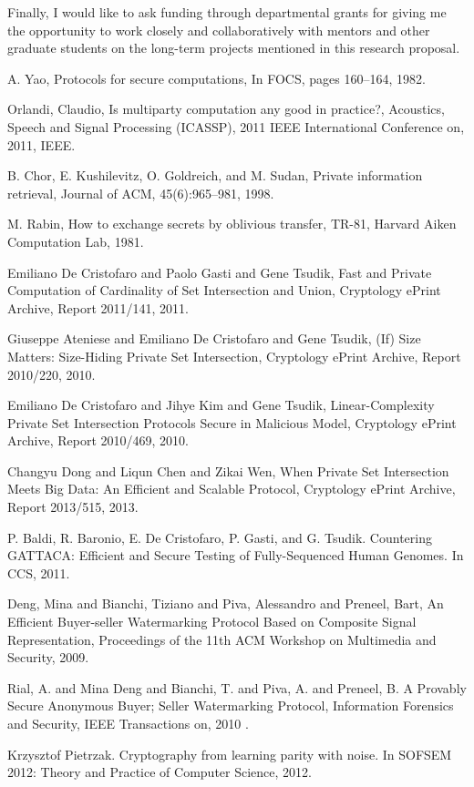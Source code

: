 \documentclass[dvips,12pt]{article}
\begin{document}
Finally, I would like to ask funding through departmental grants for giving me the opportunity to work closely and collaboratively with mentors and other graduate students on the long-term projects mentioned in this research proposal.
\begin{thebibliography}{99}

	A. Yao,
	Protocols for secure computations,	
	In FOCS, pages 160–164, 1982.

	Orlandi, Claudio,  	
  	Is multiparty computation any good in practice?,
  	{Acoustics, Speech and Signal Processing (ICASSP), 2011 IEEE International Conference on},
  	2011,
  	IEEE.

	B. Chor, E. Kushilevitz, O. Goldreich, and M. Sudan,	
	Private information retrieval,
	Journal of ACM, 45(6):965–981, 
	1998.

	M. Rabin,
	How to exchange secrets by oblivious transfer,
	TR-81, Harvard Aiken Computation Lab, 
	1981.

	Emiliano De Cristofaro and Paolo Gasti and Gene Tsudik,	
	Fast and Private Computation of Cardinality of Set Intersection and Union, 
    Cryptology ePrint Archive, Report 2011/141,
    2011.
    
	Giuseppe Ateniese and Emiliano De Cristofaro and Gene Tsudik,
    (If) Size Matters: Size-Hiding Private Set Intersection,
    Cryptology ePrint Archive, Report 2010/220,
	2010.

	Emiliano De Cristofaro and Jihye Kim and Gene Tsudik,	
	Linear-Complexity Private Set Intersection Protocols Secure in Malicious Model,
	Cryptology ePrint Archive, Report 2010/469,
	2010.

	Changyu Dong and Liqun Chen and Zikai Wen,
	When Private Set Intersection Meets Big Data: An Efficient and Scalable Protocol,
	Cryptology ePrint Archive, Report 2013/515,
	2013.
	
	P. Baldi, R. Baronio, E. De Cristofaro, P. Gasti, and G. Tsudik. 
	Countering GATTACA: Efficient and Secure Testing of Fully-Sequenced Human Genomes.
	In CCS, 
	2011.
	
	Deng, Mina and Bianchi, Tiziano and Piva, Alessandro and Preneel, Bart,
	An Efficient Buyer-seller Watermarking Protocol Based on Composite Signal Representation,
	Proceedings of the 11th ACM Workshop on Multimedia and Security,
	2009.
	
	Rial, A. and Mina Deng and Bianchi, T. and Piva, A. and Preneel, B.
	A Provably Secure Anonymous Buyer; Seller Watermarking Protocol,
	Information Forensics and Security, IEEE Transactions on,
	2010	.	

	Krzysztof Pietrzak. 
	Cryptography from learning parity with noise.
	In SOFSEM 2012: Theory and Practice of Computer Science,
	2012.
	

\end{thebibliography}
\end{document}
